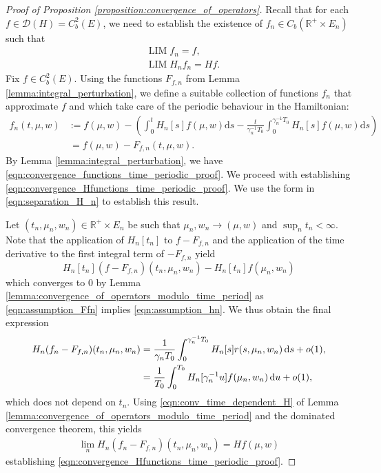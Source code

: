 \documentclass[a4paper]{article}
\newcommand{\cD}{\mathcal{D}}
\newcommand{\bR}{\mathbb{R}}
\newcommand{\dd}{ \mathrm{d}}
\DeclareMathOperator*{\LIM}{LIM}
\numberwithin{equation}{section}
\theoremstyle{definition}
\begin{document}
\begin{proof}[Proof of Proposition \ref{proposition:convergence_of_operators}]
	Recall that for each $f \in \cD(H) = C_b^2(E)$, we need to establish the existence of $f_n \in C_b(\bR^+ \times E_n)$ such that 
	\begin{align}
		& \LIM f_n = f, \label{eqn:convergence_functions_time_periodic_proof} \\
		& \LIM H_n f_n = Hf. \label{eqn:convergence_Hfunctions_time_periodic_proof}
	\end{align}
	Fix $f \in C_b^2(E)$. Using the functions $F_{f,n}$ from Lemma \ref{lemma:integral_perturbation}, we define a suitable collection of functions $f_n$ that approximate $f$ and which take care of the periodic behaviour in the Hamiltonian:
	\begin{align*}
		f_n(t,\mu,w) & := f(\mu,w) -  \left( \int_0^{t} H_n[s] f(\mu,w) \dd s - \frac{t}{\gamma_n^{-1}T_0} \int_0^{\gamma_n^{-1} T_0} H_n[s] f(\mu,w) \dd s \right) \\
		& \, = f(\mu,w) - F_{f,n}(t,\mu,w).
	\end{align*}
	By Lemma \ref{lemma:integral_perturbation}, we have \eqref{eqn:convergence_functions_time_periodic_proof}. We proceed with establishing \eqref{eqn:convergence_Hfunctions_time_periodic_proof}. We use the form in \eqref{eqn:separation_H_n} to establish this result.
	
	Let $(t_n,\mu_n,w_n) \in \bR^+ \times E_n$ be such that $\mu_n,w_n \rightarrow (\mu,w)$ and $\sup_n t_n < \infty$. Note that the application of $H_n[t_n]$ to $f  - F_{f,n}$ and the application of the time derivative to the first integral term of $-F_{f,n}$ yield 
	\begin{equation*}
		H_n[t_n](f - F_{f,n})(t_n,\mu_n,w_n) - H_n[t_n]f(\mu_n,w_n)
	\end{equation*}	
	which converges to $0$ by Lemma \ref{lemma:convergence_of_operators_modulo_time_period} as \eqref{eqn:assumption_Ffn} implies \eqref{eqn:assumption_hn}. We thus obtain the final expression
	\begin{align}
		H_n(f_n  - F_{f,n})(t_n,\mu_n,w_n) & = \frac{1}{\gamma_n T_0} \int_0^{\gamma_n^{-1} T_0} H_n[s] r(s,\mu_n,w_n) \, \dd s + o(1), \notag \\
		& = \frac{1}{T_0} \int_0^{T_0} H_n[\gamma_n^{-1} u] f(\mu_n,w_n) \, \dd u + o(1), \label{eqn:Hn_to_f_with_perturbation}
	\end{align}
	which does not depend on $t_n$. Using \eqref{eqn:conv_time_dependent_H} of Lemma \ref{lemma:convergence_of_operators_modulo_time_period} and the dominated convergence theorem, this yields 
	\begin{align*}
		\lim_n H_n(f_n - F_{f,n})(t_n,\mu_n,w_n) = Hf(\mu,w)
	\end{align*}
	establishing \eqref{eqn:convergence_Hfunctions_time_periodic_proof}.
	
\end{proof}
\end{document}
